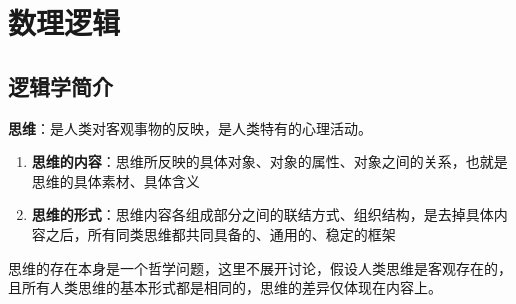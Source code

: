 

\chapter{数理逻辑}

\section{逻辑学简介}

\textbf{思维}：是人类对客观事物的反映，是人类特有的心理活动。
\begin{enumerate}
    \item \textbf{思维的内容}：思维所反映的具体对象、对象的属性、对象之间的关系，也就是思维的具体素材、具体含义
    \item \textbf{思维的形式}：思维内容各组成部分之间的联结方式、组织结构，是去掉具体内容之后，所有同类思维都共同具备的、通用的、稳定的框架
\end{enumerate}
\vspace{1em}

\begin{note}
    思维的存在本身是一个哲学问题，这里不展开讨论，假设人类思维是客观存在的，且所有人类思维的基本形式都是相同的，思维的差异仅体现在内容上。
\end{note}

